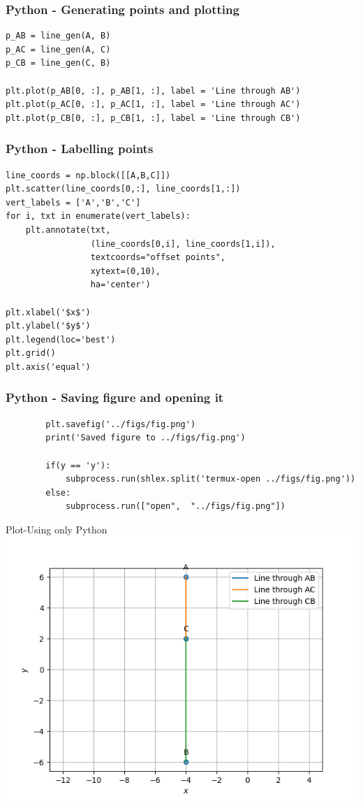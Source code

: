 \documentclass{beamer}
\begin{document}
\begin{frame}[fragile]
    \frametitle{Python - Generating points and plotting}
    \begin{lstlisting}
p_AB = line_gen(A, B)
p_AC = line_gen(A, C)
p_CB = line_gen(C, B)

plt.plot(p_AB[0, :], p_AB[1, :], label = 'Line through AB')
plt.plot(p_AC[0, :], p_AC[1, :], label = 'Line through AC')
plt.plot(p_CB[0, :], p_CB[1, :], label = 'Line through CB')
\end{lstlisting}
\end{frame}

\begin{frame}[fragile]
    \frametitle{Python - Labelling points}
    \begin{lstlisting}
line_coords = np.block([[A,B,C]])
plt.scatter(line_coords[0,:], line_coords[1,:])
vert_labels = ['A','B','C']
for i, txt in enumerate(vert_labels):
    plt.annotate(txt, 
                 (line_coords[0,i], line_coords[1,i]),
                 textcoords="offset points", 
                 xytext=(0,10),
                 ha='center')

plt.xlabel('$x$')
plt.ylabel('$y$')
plt.legend(loc='best')
plt.grid() 
plt.axis('equal')
    \end{lstlisting}
\end{frame}

\begin{frame}[fragile]
    \frametitle{Python - Saving figure and opening it}
    \begin{lstlisting}
        plt.savefig('../figs/fig.png')
        print('Saved figure to ../figs/fig.png')
        
        if(y == 'y'):
            subprocess.run(shlex.split('termux-open ../figs/fig.png'))
        else:
            subprocess.run(["open",  "../figs/fig.png"])
    \end{lstlisting}
\end{frame}


\begin{frame}{Plot-Using only Python}
    \centering
    \includegraphics[width=\columnwidth, height=0.8\textheight, keepaspectratio]{../figs/fig.png}     
\end{frame}
\end{document}
